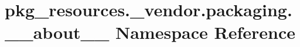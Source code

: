 \hypertarget{namespacepkg__resources_1_1__vendor_1_1packaging_1_1____about____}{}\section{pkg\+\_\+resources.\+\_\+vendor.\+packaging.\+\_\+\+\_\+about\+\_\+\+\_\+ Namespace Reference}
\label{namespacepkg__resources_1_1__vendor_1_1packaging_1_1____about____}
